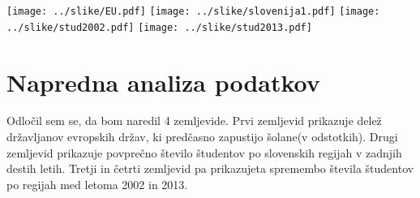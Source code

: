 \documentclass[11pt,a4paper]{article}
\begin{document}
\texttt{[image: ../slike/EU.pdf]}
\texttt{[image: ../slike/slovenija1.pdf]}
\texttt{[image: ../slike/stud2002.pdf]}
\texttt{[image: ../slike/stud2013.pdf]}

\section{Napredna analiza podatkov}
Odločil sem se, da bom naredil 4 zemljevide. Prvi zemljevid prikazuje delež državljanov evropskih držav, ki predčasno zapustijo šolane(v odstotkih). Drugi zemljevid prikazuje povprečno število študentov po slovenskih regijah v zadnjih destih letih. Tretji in četrti zemljevid pa prikazujeta spremembo števila študentov po regijah med letoma 2002 in 2013.
\end{document}
